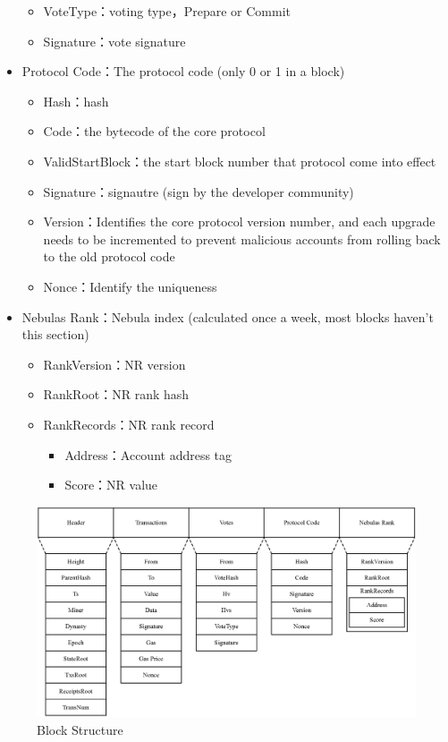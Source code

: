 \begin{itemize}
\begin{itemize}
		\item VoteType：voting type，Prepare or Commit
		\item Signature：vote signature
		\end{itemize}
	\item Protocol Code：The protocol code (only 0 or 1 in a block)
		\begin{itemize}
		\item Hash：hash
		\item Code：the bytecode of the core protocol
		\item ValidStartBlock：the start block number that protocol come into effect
		\item Signature：signautre (sign by the developer community)
		\item Version：Identifies the core protocol version number, and each upgrade needs to be incremented to prevent malicious accounts from rolling back to the old protocol code
		\item Nonce：Identify the uniqueness
		\end{itemize}
	\item Nebulas Rank：Nebula index (calculated once a week, most blocks haven't this section)
		\begin{itemize}
		\item RankVersion：NR version
		\item RankRoot：NR rank hash
		\item RankRecords：NR rank record
			\begin{itemize}
				\item Address：Account address tag
				\item Score：NR value
			\end{itemize}
		\end{itemize}
\end{itemize}

\begin{figure}[!h]
\centering
\includegraphics[width=13.8cm]{./figs/block}
\caption{Block Structure}
\label{fig:block}
\end{figure}

